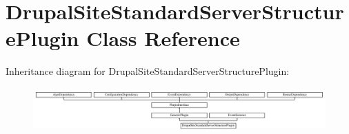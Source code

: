 \hypertarget{classDrupalSiteStandardServerStructurePlugin}{\section{Drupal\-Site\-Standard\-Server\-Structure\-Plugin Class Reference}
\label{classDrupalSiteStandardServerStructurePlugin}
}
Inheritance diagram for Drupal\-Site\-Standard\-Server\-Structure\-Plugin\-:\begin{figure}[H]
\begin{center}
\leavevmode
\includegraphics[height=1.750000cm]{classDrupalSiteStandardServerStructurePlugin}
\end{center}
\end{figure}
